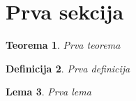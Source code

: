 \documentclass[11pt]{article}
\newtheorem{thm}{Teorema}[subsection]
\newtheorem{df}[thm]{Definicija}
\newtheorem{lem}[thm]{Lema}
\begin{document}
	\section{Prva sekcija}

	\begin{thm}
		Prva teorema
	\end{thm}

	\begin{df}
		Prva definicija
	\end{df}

	\begin{lem}
		Prva lema
	\end{lem}
\end{document}
